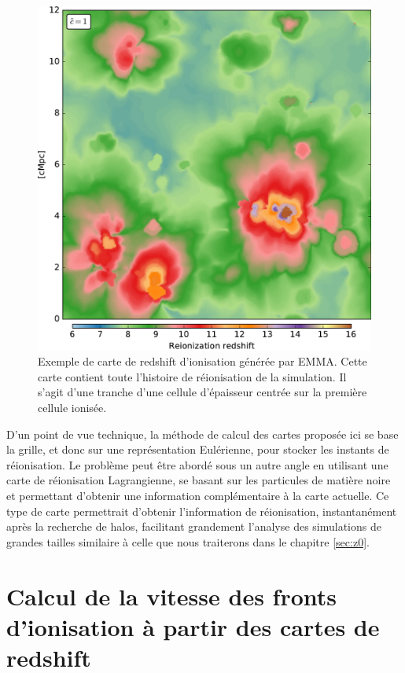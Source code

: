 \begin{figure}
        \includegraphics[width=.95\linewidth]{img/04_mapreio/map_z_c1.pdf} 
        \caption[Carte de redshift d'ionisation]{Exemple de carte de redshift d'ionisation générée par EMMA.
        Cette carte contient toute l'histoire de réionisation de la simulation.
        Il s'agit d'une tranche d'une cellule d'épaisseur centrée sur la première cellule ionisée.
 		\label{fig:zmap}}
\end{figure}

D'un point de vue technique, la méthode de calcul des cartes proposée ici se base la grille, et donc sur une représentation Eulérienne, pour stocker les instants de réionisation.
Le problème peut être abordé sous un autre angle en utilisant une carte de réionisation Lagrangienne, se basant sur les particules de matière noire et permettant d'obtenir une information complémentaire à la carte actuelle.
Ce type de carte permettrait d'obtenir l'information de réionisation, instantanément après la recherche de halos, facilitant grandement l'analyse des simulations de grandes tailles similaire à celle que nous traiterons dans le chapitre \ref{sec:z0}.

\section{Calcul de la vitesse des fronts d’ionisation à partir des cartes de redshift}
\label{sec:vreio}

